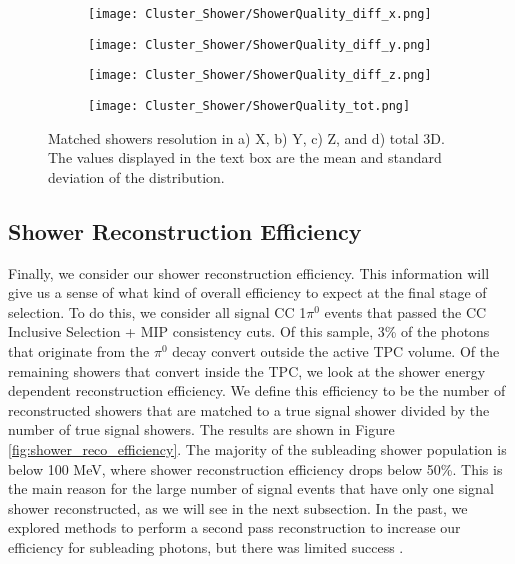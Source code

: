 \begin{figure}[h!]
\centering
  \begin{subfigure}[t]{0.45\textwidth}
    \centering
\texttt{[image: Cluster\_Shower/ShowerQuality\_diff\_x.png]}
  \caption{ }
  \end{subfigure} 
  \hspace{5mm}
  \begin{subfigure}[t]{0.45\textwidth}
    \centering
\texttt{[image: Cluster\_Shower/ShowerQuality\_diff\_y.png]}
  \caption{ }
  \end{subfigure} 
  \hspace{5mm}
  \begin{subfigure}[t]{0.45\textwidth}
    \centering
\texttt{[image: Cluster\_Shower/ShowerQuality\_diff\_z.png]}
  \caption{ }
  \end{subfigure} 
  \hspace{5mm}
  \begin{subfigure}[t]{0.45\textwidth}
    \centering
\texttt{[image: Cluster\_Shower/ShowerQuality\_tot.png]}
  \caption{ }
  \end{subfigure} 
\caption{ Matched showers resolution in a) X, b) Y, c) Z, and d) total 3D. The values displayed in the text box are the mean and standard deviation of the distribution. }
\label{fig:showerquality_xyzres}
\end{figure}

\clearpage
\subsection{Shower Reconstruction Efficiency}
Finally, we consider our shower reconstruction efficiency. This information will give us a sense of what kind of overall efficiency to expect at the final stage of selection. To do this, we consider all signal CC 1$\pi^0$ events that passed the CC Inclusive Selection + MIP consistency cuts. Of this sample, 3\% of the photons that originate from the $\pi^0$ decay convert outside the active TPC volume. Of the remaining showers that convert inside the TPC, we look at the shower energy dependent reconstruction efficiency. We define this efficiency to be the number of reconstructed showers that are matched to a true signal shower divided by the number of true signal showers. The results are shown in Figure \ref{fig:shower_reco_efficiency}.  The majority of the subleading shower population is below 100 MeV, where shower reconstruction efficiency drops below 50\%.  This is the main reason for the large number of signal events that have only one signal shower reconstructed, as we will see in the next subsection. In the past, we explored methods to perform a second pass reconstruction to increase our efficiency for subleading photons, but there was limited success \cite{bib:jz_catch_subleading}.  

